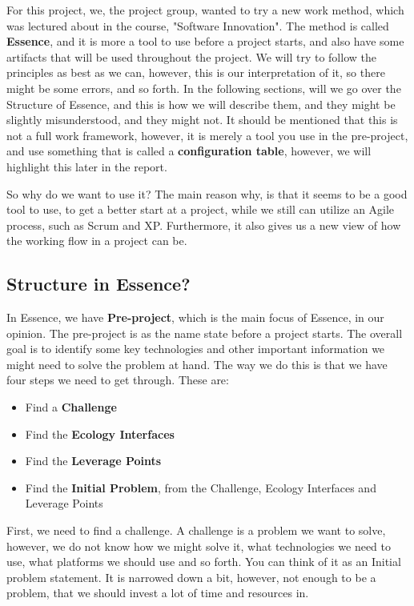 For this project, we, the project group, wanted to try a new work method, which was lectured about in the course, "Software Innovation".
The method is called \textbf{Essence}, and it is more a tool to use before a project starts, and also have some artifacts that will be used throughout the project.
We will try to follow the principles as best as we can, however, this is our interpretation of it, so there might be some errors, and so forth.
In the following sections, will we go over the Structure of Essence, and this is how we will describe them, and they might be slightly misunderstood, and they might not.
It should be mentioned that this is not a full work framework, however, it is merely a tool you use in the pre-project, and use something that is called a \textbf{configuration table}, however, we will highlight this later in the report.

So why do we want to use it?
The main reason why, is that it seems to be a good tool to use, to get a better start at a project, while we still can utilize an Agile process, such as Scrum and XP.
Furthermore, it also gives us a new view of how the working flow in a project can be.

\subsection{Structure in Essence?}
In Essence, we have \textbf{Pre-project}, which is the main focus of Essence, in our opinion.
The pre-project is as the name state before a project starts. 
The overall goal is to identify some key technologies and other important information we might need to solve the problem at hand.
The way we do this is that we have four steps we need to get through.
These are:

\begin{itemize}
    \item Find a \textbf{Challenge}
    \item Find the \textbf{Ecology Interfaces}
    \item Find the \textbf{Leverage Points}
    \item Find the \textbf{Initial Problem}, from the Challenge, Ecology Interfaces and Leverage Points
\end{itemize}

First, we need to find a challenge.
A challenge is a problem we want to solve, however, we do not know how we might solve it, what technologies we need to use, what platforms we should use and so forth.
You can think of it as an Initial problem statement.
It is narrowed down a bit, however, not enough to be a problem, that we should invest a lot of time and resources in.

